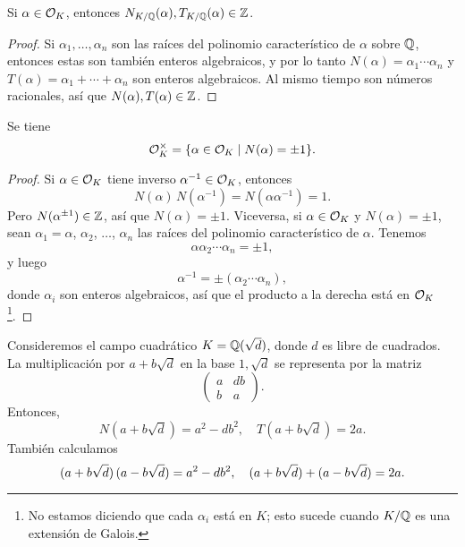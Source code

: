 \begin{proposicion}
  Si $\alpha \in \mathcal{O}_K$, entonces
  $N_{K/\mathbb{Q}} (\alpha), T_{K/\mathbb{Q}} (\alpha) \in \mathbb{Z}$.

  \begin{proof}
    Si $\alpha_1, \ldots, \alpha_n$ son las raíces del polinomio característico
    de $\alpha$ sobre $\mathbb{Q}$, entonces estas son también enteros algebraicos,
    y por lo tanto $N (\alpha) = \alpha_1\cdots\alpha_n$ y
    $T (\alpha) = \alpha_1 + \cdots + \alpha_n$ son enteros algebraicos.
    Al mismo tiempo son números racionales, así que
    $N (\alpha), T (\alpha) \in \mathbb{Z}$.
  \end{proof}
\end{proposicion}

\begin{proposicion}
  Se tiene
  $$\mathcal{O}_K^\times = \{ \alpha \in \mathcal{O}_K \mid N (\alpha) = \pm 1 \}.$$

  \begin{proof}
    Si $\alpha \in \mathcal{O}_K$ tiene inverso $\alpha^{-1} \in \mathcal{O}_K$, entonces
    $$N (\alpha)\, N (\alpha^{-1}) = N (\alpha\alpha^{-1}) = 1.$$
    Pero $N (\alpha^{\pm 1}) \in \mathbb{Z}$, así que $N (\alpha) = \pm 1$.
    Viceversa, si $\alpha \in \mathcal{O}_K$ y $N (\alpha) = \pm 1$, sean
    $\alpha_1 = \alpha$, $\alpha_2$, $\ldots$, $\alpha_n$ las raíces
    del polinomio característico de $\alpha$. Tenemos
    $$\alpha \alpha_2 \cdots \alpha_n = \pm 1,$$
    y luego
    $$\alpha^{-1} = \pm (\alpha_2 \cdots \alpha_n),$$
    donde $\alpha_i$ son enteros algebraicos, así que el producto a la derecha
    está en $\mathcal{O}_K$\footnote{No estamos diciendo que cada $\alpha_i$ está en
      $K$; esto sucede cuando $K/\mathbb{Q}$ es una extensión de Galois.}.
  \end{proof}
\end{proposicion}

\begin{ejemplo}
  Consideremos el campo cuadrático $K = \mathbb{Q} (\sqrt{d})$, donde $d$ es libre de
  cuadrados. La multiplicación por $a + b\sqrt{d}$ en la base $1, \sqrt{d}$ se
  representa por la matriz
  \[ \begin{pmatrix}
    a & db \\
    b & a
  \end{pmatrix}. \]
  Entonces,
  \[ N (a + b\sqrt{d}) = a^2 - db^2, \quad
     T (a + b\sqrt{d}) = 2a. \]
  También calculamos
  \[ (a + b\sqrt{d})\,(a - b\sqrt{d}) = a^2 - db^2, \quad
     (a + b\sqrt{d}) + (a - b\sqrt{d}) = 2a. \qedhere \]
\end{ejemplo}

